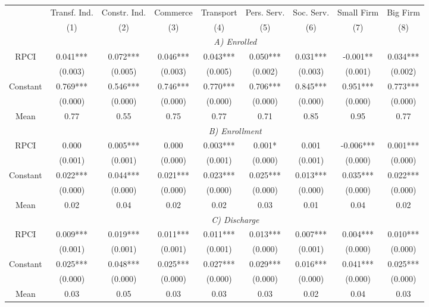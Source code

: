 \begin{tabular}{ccccccccc}
\toprule
\toprule
      & Transf. Ind. & Constr. Ind. & Commerce & Transport & Pers. Serv. & Soc. Serv. & Small Firm & Big Firm \\
      & (1)   & (2)   & (3)   & (4)   & (5)   & (6)   & (7)   & (8) \\
\cmidrule{2-9}      & \multicolumn{8}{c}{\textit{A) Enrolled}} \\
\midrule
RPCI  & 0.041*** & 0.072*** & 0.046*** & 0.043*** & 0.050*** & 0.031*** & -0.001** & 0.034*** \\
      & (0.003) & (0.005) & (0.003) & (0.005) & (0.002) & (0.003) & (0.001) & (0.002) \\
Constant & 0.769*** & 0.546*** & 0.746*** & 0.770*** & 0.706*** & 0.845*** & 0.951*** & 0.773*** \\
      & (0.000) & (0.000) & (0.000) & (0.000) & (0.000) & (0.000) & (0.000) & (0.000) \\
Mean  & 0.77  & 0.55  & 0.75  & 0.77  & 0.71  & 0.85  & 0.95  & 0.77 \\
\cmidrule{2-9}      & \multicolumn{8}{c}{\textit{B) Enrollment}} \\
\midrule
RPCI  & 0.000 & 0.005*** & 0.000 & 0.003*** & 0.001* & 0.001 & -0.006*** & 0.001*** \\
      & (0.001) & (0.001) & (0.000) & (0.001) & (0.000) & (0.001) & (0.000) & (0.000) \\
Constant & 0.022*** & 0.044*** & 0.021*** & 0.023*** & 0.025*** & 0.013*** & 0.035*** & 0.022*** \\
      & (0.000) & (0.000) & (0.000) & (0.000) & (0.000) & (0.000) & (0.000) & (0.000) \\
Mean  & 0.02  & 0.04  & 0.02  & 0.02  & 0.03  & 0.01  & 0.04  & 0.02 \\
\cmidrule{2-9}      & \multicolumn{8}{c}{\textit{C) Discharge}} \\
\midrule
RPCI  & 0.009*** & 0.019*** & 0.011*** & 0.011*** & 0.013*** & 0.007*** & 0.004*** & 0.010*** \\
      & (0.001) & (0.001) & (0.001) & (0.001) & (0.000) & (0.001) & (0.000) & (0.000) \\
Constant & 0.025*** & 0.048*** & 0.025*** & 0.027*** & 0.029*** & 0.016*** & 0.041*** & 0.025*** \\
      & (0.000) & (0.000) & (0.000) & (0.000) & (0.000) & (0.000) & (0.000) & (0.000) \\
Mean  & 0.03  & 0.05  & 0.03  & 0.03  & 0.03  & 0.02  & 0.04  & 0.03 \\

\end{tabular}

